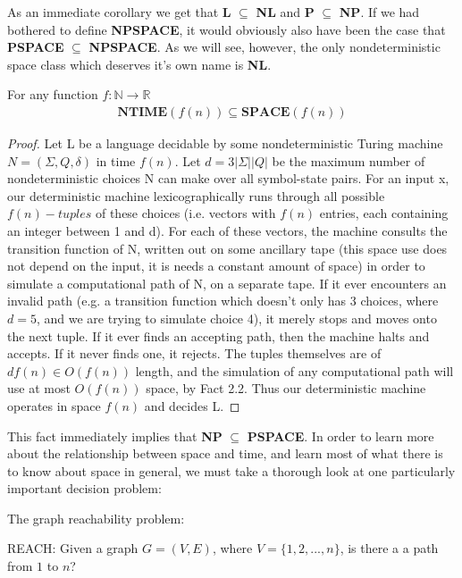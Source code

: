 As an immediate corollary we get that \textbf{L} $\subseteq$ \textbf{NL} and \textbf{P} $\subseteq$ \textbf{NP}. If we had bothered to define \textbf{NPSPACE}, it would obviously also have been the case that \textbf{PSPACE} $\subseteq$ \textbf{NPSPACE}. As we will see, however, the only nondeterministic space class which deserves it's own name is \textbf{NL}. 
\begin{fact}
For any function $f:\mathbb{N} \to \mathbb{R}$
\begin{align}
\textbf{NTIME$(f(n))$} \subseteq \textbf{SPACE$(f(n))$}
\end{align}
\end{fact}
\begin{proof}
Let L be a language decidable by some nondeterministic Turing machine $N=(\Sigma,Q,\delta)$ in time $f(n)$. Let $d=3|\Sigma||Q|$ be the maximum number of nondeterministic choices N can make over all symbol-state pairs. For an input x, our deterministic machine lexicographically runs through all possible $f(n)-tuples$ of these choices (i.e. vectors with $f(n)$ entries, each containing an integer between 1 and d). For each of these vectors, the machine consults the transition function of N, written out on some ancillary tape (this space use does not depend on the input, it is needs a constant amount of space) in order to simulate a computational path of N, on a separate tape. If it ever encounters an invalid path (e.g. a transition function which doesn't only has 3 choices, where $d=5$, and we are trying to simulate choice 4), it merely stops and moves onto the next tuple. If it ever finds an accepting path, then the machine halts and accepts. If it never finds one, it rejects. The tuples themselves are of $df(n) \in O(f(n))$ length, and the simulation of any computational path will use at most $O(f(n))$ space, by Fact 2.2. Thus our deterministic machine operates in space $f(n)$ and decides L.
\end{proof}
\par This fact immediately implies that \textbf{NP} $\subseteq$ \textbf{PSPACE}. 
In order to learn more about the relationship between space and time, and learn most of what there is to know about space in general, we must take a thorough look at one particularly important decision problem:
\begin{problem} The graph reachability problem:
\begin{center}
REACH: Given a graph $G=(V,E)$, where $V=\{1,2,...,n\}$, is there a a path from $1$ to $n$?
\end{center}
\end{problem}
